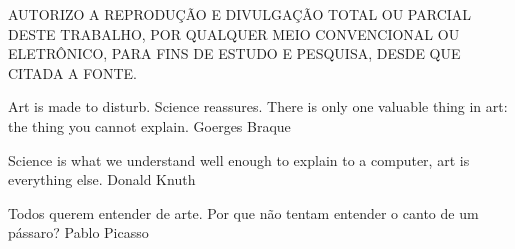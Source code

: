 \capa


\folhaderosto
% 
\pretextualchapter{}
	\thispagestyle{plain}
	\noindent \parbox{5.7in}{\centering AUTORIZO A REPRODUÇÃO E DIVULGAÇÃO TOTAL OU PARCIAL DESTE TRABALHO, POR QUALQUER MEIO CONVENCIONAL OU ELETRÔNICO, PARA FINS DE ESTUDO E PESQUISA, DESDE QUE CITADA A FONTE.}

\pretextualchapter{}



%

\afterpage{\blankpage}




\pretextualchapter{}
	\begin{epigrafetop}
		{Art is made to disturb. Science reassures. There is only one valuable thing in art: the thing you cannot explain.}
        {Goerges Braque}
	\end{epigrafetop}

	\begin{epigrafemid}
		{Science is what we understand well enough to explain to a
		computer, art is everything else.}
		{Donald Knuth} %
	\end{epigrafemid}
	\vspace{-1cm}

	\begin{epigrafebot}
                {Todos querem entender de arte. Por que não tentam entender o
                canto de um pássaro?}
                {Pablo Picasso}
	\end{epigrafebot}



\afterpage{\blankpage}

\resumoeabstract %

\afterpage{\blankpage}


\listadefiguras %


